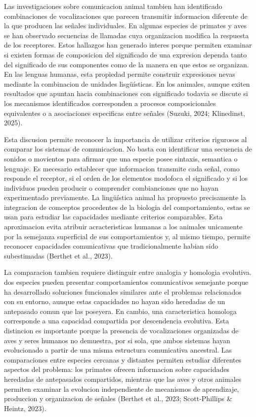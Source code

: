 \documentclass[12pt]{article}
\begin{document}
Las investigaciones sobre comunicacion animal tambien han identificado combinaciones de vocalizaciones que parecen transmitir informacion diferente de la que producen las señales individuales. En algunas especies de primates y aves se han observado secuencias de llamadas cuya organizacion modifica la respuesta de los receptores. Estos hallazgos han generado interes porque permiten examinar si existen formas de composicion del significado de una expresion dependa tanto del significado de sus componentes como de la manera en que estos se organizan. En las lenguas humanas, esta propiedad permite construir expresiones nevas mediante la combinacion de unidades lisgüísticas. En los animales, aunque exiten resultados que apuntan hacia combinaciones con significado todavia se discute si los mecanismos identificados corresponden a procesos composicionales equivalentes o a asociaciones especificas entre señales (Suzuki, 2024; Klinedinst, 2025).

Esta discusion permite reconocer la importancia de utilizar criterios rigurosos al comparar los sistemas de comunicacion. No basta con identificar una secuencia de sonidos o movientos para afirmar que una especie posee sintaxis, semantica o lenguaje. Es mecesario establecer que informacion transmite cada señal, como responde el receptor, si el orden de los elementos modofoca el significado y si los individuos pueden producir o comprender combianciones que no hayan experimentado previamente. La lingüística animal ha propuesto precisamente la integracion de comceptos procedentes de la biologia del comportamiento, estas se usan para estudiar las capacidades mediante criterios comparables. Esta aproximacion evita atribuir acracteristicas humanas a los animales unicamente por la semejanza superficial de sus comportamientos y, al mismo tiempo, permite reconocer capacidades comunicativas que tradicionalmente habian sido subestimadas (Berthet et al., 2023).

La comparacion tambien requiere distinguir entre analogia y homologia evolutiva. dos especies pueden presentar comportamientos comunicativos semejante porque ha desarrollado soluciones funcionales similares ante el problemas relacionados con su entorno, aunque estas capacidades no hayan sido heredadas de un antepasado comun que las poseyera. En cambio, una caracteristica homologa corresponde a una capacidad compartida por descendencia evolutiva. Esta distincion es importante porque la presencia de vocalizaciones organizadas de aves y seres humanos no demuestra, por si sola, que ambos sistemas hayan evolucionado a partir de una misma estructura comunicativa ancestral. Las comparaciones entre especies cercanas y distantes permiten estudiar diferentes aspectos del problema: los primates ofrecen informacion sobre capacidades heredadas de antepasados compartidos, mientras que las aves y otros animales permiten examinar la evolucion independiente de mecanismos de aprendizaje, produccion y organizacion de señales (Berthet et al., 2023; Scott-Phillips \& Heintz, 2023).
\end{document}
